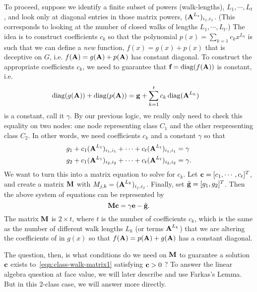 To proceed, suppose we identify a finite subset of powers (walk-lengths), $L_1, \cdots, L_t$, and look only at diagonal entries in those matrix powers, $(\textbf{A}^{L_s})_{i_j,i_j}$. (This corresponds to looking at the number of closed walks of lengths $L_1, \cdots, L_t$.)
The idea is to construct coefficients $c_k$ so that the polynomial $p(x) = \sum_{k=1} c_k x^{L_k}$ is such that we can define a \emph{new} function, $f(x) = g(x) + p(x)$ that is deceptive on $G$, i.e. $f(\textbf{A}) = g(\textbf{A}) + p(\textbf{A})$ has constant diagonal.
To construct the appropriate coefficients $c_k$, we need to guarantee that $\textbf{f} = \operatorname{diag}(f(\textbf{A}))$ is constant, i.e.
\begin{align}
  \operatorname{diag}(g(\textbf{A})) + \operatorname{diag}(p(\textbf{A})) &= \textbf{g} + \sum_{k=1}^{t} c_k \operatorname{diag}(\textbf{A}^{L_k})
\end{align}
is a constant, call it $\gamma$.
By our previous logic, we really only need to check this equality on two nodes: one node representing class $C_1$ and the other respresenting class $C_2$.
In other words, we need coefficients $c_k$ and a constant $\gamma$ so that
\begin{align}
  g_1 + c_1 (\textbf{A}^{L_1})_{i_1,i_1} + \cdots + c_t (\textbf{A}^{L_t})_{i_1,i_1} &= \gamma \\
  g_2 + c_1 (\textbf{A}^{L_1})_{i_2,i_2} + \cdots + c_t (\textbf{A}^{L_t})_{i_2,i_2} &= \gamma .
\end{align}
We want to turn this into a matrix equation to solve for $c_k$. Let $\textbf{c} = [ c_1, \cdots, c_t]^T$, and create a matrix $\textbf{M}$ with $M_{j,k} = (\textbf{A}^{L_k})_{i_j,i_j}$. Finally, set $\tilde{\textbf{g}} = [ g_1, g_2 ]^T$.%
Then the above system of equations can be represented by
\begin{equation}\label{eqn:class-walk-matrix1}
  \textbf{M}\textbf{c} = \gamma \textbf{e} - \tilde{\textbf{g}}.
\end{equation}
 The matrix $\textbf{M}$ is $2 \times t$, where $t$ is the number of coefficients $c_k$, which is the same as the number of different walk lengths $L_k$ (or terms $\textbf{A}^{L_k}$) that we are altering the coefficients of in $g(x)$ so that $f(\textbf{A}) = p(\textbf{A}) + g(\textbf{A})$ has a constant diagonal.

 The question, then, is what conditions do we need on $\textbf{M}$ to guarantee a solution $\textbf{c}$ exists to~\eqref{eqn:class-walk-matrix1} satisfying $\textbf{c} > 0$ ?
 To answer the linear algebra question at face value, we will later describe and use Farkas's Lemma. But in this 2-class case, we will answer more directly.


